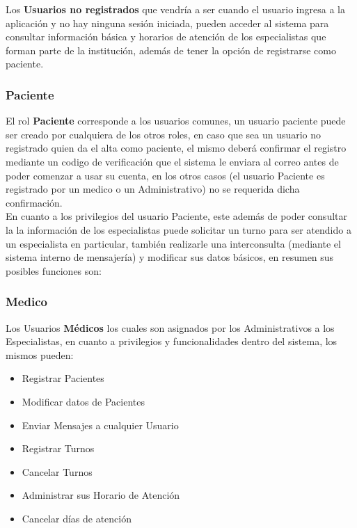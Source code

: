Los \textbf{Usuarios no registrados} que vendría a ser cuando el usuario ingresa
a la aplicación y no hay ninguna sesión iniciada, pueden acceder al sistema para 
consultar información básica y horarios de atención de los especialistas que 
forman parte de la institución, además de tener la opción de registrarse 
como paciente.\\[0.1cm]    

\subsubsection{Paciente}

El rol \textbf{Paciente} corresponde a los usuarios comunes, un usuario paciente puede 
ser creado por cualquiera de los otros roles, en caso que sea un usuario no registrado
quien da el alta como paciente, el mismo deberá confirmar el registro mediante un
codigo de verificación que el sistema le enviara al correo antes de poder comenzar
a usar su cuenta, en los otros casos (el usuario Paciente es registrado por un 
medico o un Administrativo) no se requerida dicha confirmación.\\[0.1cm]

En cuanto a los privilegios del usuario Paciente, este además de poder consultar la 
la información de los especialistas puede solicitar un turno para ser atendido 
a un especialista en particular, también realizarle una interconsulta (mediante
el sistema interno de mensajería) y modificar sus datos básicos, en resumen sus 
posibles funciones son:


\subsubsection{Medico}

Los Usuarios \textbf{Médicos} los cuales son asignados por los Administrativos a 
los Especialistas, en cuanto a privilegios y funcionalidades dentro del sistema, 
los mismos pueden:

\begin{itemize}
    \item Registrar Pacientes
    \item Modificar datos de Pacientes
    \item Enviar Mensajes a cualquier Usuario
    \item Registrar Turnos 
    \item Cancelar Turnos
    \item Administrar sus Horario de Atención
    \item Cancelar días de atención
\end{itemize}

